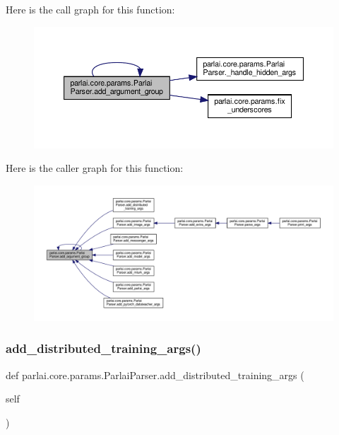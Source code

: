 Here is the call graph for this function\+:
\nopagebreak
\begin{figure}[H]
\begin{center}
\leavevmode
\includegraphics[width=350pt]{classparlai_1_1core_1_1params_1_1ParlaiParser_a2855a5676bf638bfc9491577e603eee3_cgraph}
\end{center}
\end{figure}
Here is the caller graph for this function\+:
\nopagebreak
\begin{figure}[H]
\begin{center}
\leavevmode
\includegraphics[width=350pt]{classparlai_1_1core_1_1params_1_1ParlaiParser_a2855a5676bf638bfc9491577e603eee3_icgraph}
\end{center}
\end{figure}
\mbox{\label{classparlai_1_1core_1_1params_1_1ParlaiParser_a718f9802eec8bcac25866900d2ae69b0}} 
\subsubsection{\texorpdfstring{add\+\_\+distributed\+\_\+training\+\_\+args()}{add\_distributed\_training\_args()}}
{\footnotesize\ttfamily def parlai.\+core.\+params.\+Parlai\+Parser.\+add\+\_\+distributed\+\_\+training\+\_\+args (\begin{DoxyParamCaption}\item[{}]{self }\end{DoxyParamCaption})}

